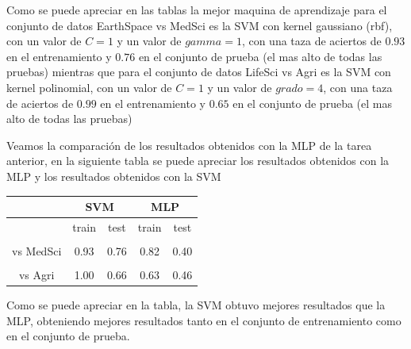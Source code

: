 \documentclass{article}
\theoremstyle{mytheoremstyle}
\theoremstyle{mytheoremstyle}
\theoremstyle{myproblemstyle}
\begin{document}
Como se puede apreciar en las tablas la mejor maquina de aprendizaje para el conjunto de datos EarthSpace vs MedSci es la SVM con kernel gaussiano (rbf), con un valor de $C = 1$ y un valor de $gamma = 1$, con una taza de aciertos de $0.93$ en el entrenamiento y $0.76$ en el conjunto de prueba (el mas alto  de todas las pruebas) mientras que para el conjunto de datos LifeSci vs Agri es la SVM con kernel polinomial, con un valor de $C = 1$ y un valor de $grado = 4$, con una taza de aciertos de $0.99$ en el entrenamiento y $0.65$ en el conjunto de prueba (el mas alto  de todas las pruebas)

Veamos la comparación de los resultados obtenidos con la MLP de la tarea anterior, en la siguiente tabla se puede apreciar los resultados obtenidos con la MLP y los resultados obtenidos con la SVM

\begin{longtable}{ccccc}
  \cline{2-5}
                                                                 & \multicolumn{2}{c}{SVM} & \multicolumn{2}{c}{MLP}                \\ \cline{2-5}
  \endfirsthead
  \endhead
                                                                 & train                   & test                    & train & test \\ \hline
  \begin{tabular}[c]{@{}c@{}}EarthSpace\\ vs MedSci\end{tabular} & 0.93                    & 0.76                    & 0.82  & 0.40 \\ \hline
  \begin{tabular}[c]{@{}c@{}}LifeSci\\ vs Agri\end{tabular}      & 1.00                    & 0.66                    & 0.63  & 0.46 \\ \hline
\end{longtable}
Como se puede apreciar en la tabla, la SVM obtuvo mejores resultados que la MLP, obteniendo mejores resultados tanto en el conjunto de entrenamiento como en el conjunto de prueba.
\end{document}
